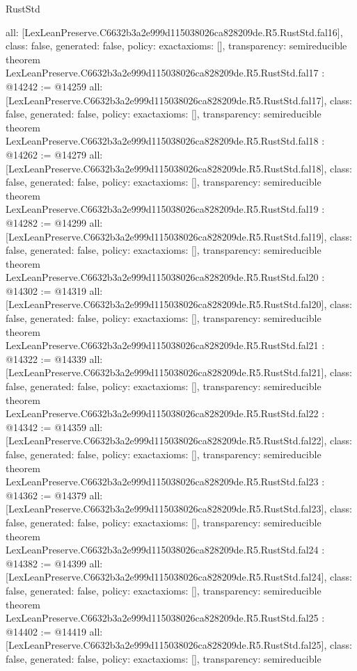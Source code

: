 \begin{lexlean}{RustStd}
\begin{coremodule}
{  all: [LexLeanPreserve.C6632b3a2e999d115038026ca828209de.R5.RustStd.fal16],
  class: false,
  generated: false,
  policy: exact{axioms: []},
  transparency: semireducible
}
theorem LexLeanPreserve.C6632b3a2e999d115038026ca828209de.R5.RustStd.fal17 : @14242 := @14259 {
  all: [LexLeanPreserve.C6632b3a2e999d115038026ca828209de.R5.RustStd.fal17],
  class: false,
  generated: false,
  policy: exact{axioms: []},
  transparency: semireducible
}
theorem LexLeanPreserve.C6632b3a2e999d115038026ca828209de.R5.RustStd.fal18 : @14262 := @14279 {
  all: [LexLeanPreserve.C6632b3a2e999d115038026ca828209de.R5.RustStd.fal18],
  class: false,
  generated: false,
  policy: exact{axioms: []},
  transparency: semireducible
}
theorem LexLeanPreserve.C6632b3a2e999d115038026ca828209de.R5.RustStd.fal19 : @14282 := @14299 {
  all: [LexLeanPreserve.C6632b3a2e999d115038026ca828209de.R5.RustStd.fal19],
  class: false,
  generated: false,
  policy: exact{axioms: []},
  transparency: semireducible
}
theorem LexLeanPreserve.C6632b3a2e999d115038026ca828209de.R5.RustStd.fal20 : @14302 := @14319 {
  all: [LexLeanPreserve.C6632b3a2e999d115038026ca828209de.R5.RustStd.fal20],
  class: false,
  generated: false,
  policy: exact{axioms: []},
  transparency: semireducible
}
theorem LexLeanPreserve.C6632b3a2e999d115038026ca828209de.R5.RustStd.fal21 : @14322 := @14339 {
  all: [LexLeanPreserve.C6632b3a2e999d115038026ca828209de.R5.RustStd.fal21],
  class: false,
  generated: false,
  policy: exact{axioms: []},
  transparency: semireducible
}
theorem LexLeanPreserve.C6632b3a2e999d115038026ca828209de.R5.RustStd.fal22 : @14342 := @14359 {
  all: [LexLeanPreserve.C6632b3a2e999d115038026ca828209de.R5.RustStd.fal22],
  class: false,
  generated: false,
  policy: exact{axioms: []},
  transparency: semireducible
}
theorem LexLeanPreserve.C6632b3a2e999d115038026ca828209de.R5.RustStd.fal23 : @14362 := @14379 {
  all: [LexLeanPreserve.C6632b3a2e999d115038026ca828209de.R5.RustStd.fal23],
  class: false,
  generated: false,
  policy: exact{axioms: []},
  transparency: semireducible
}
theorem LexLeanPreserve.C6632b3a2e999d115038026ca828209de.R5.RustStd.fal24 : @14382 := @14399 {
  all: [LexLeanPreserve.C6632b3a2e999d115038026ca828209de.R5.RustStd.fal24],
  class: false,
  generated: false,
  policy: exact{axioms: []},
  transparency: semireducible
}
theorem LexLeanPreserve.C6632b3a2e999d115038026ca828209de.R5.RustStd.fal25 : @14402 := @14419 {
  all: [LexLeanPreserve.C6632b3a2e999d115038026ca828209de.R5.RustStd.fal25],
  class: false,
  generated: false,
  policy: exact{axioms: []},
  transparency: semireducible
}
\end{coremodule}
\end{lexlean}
